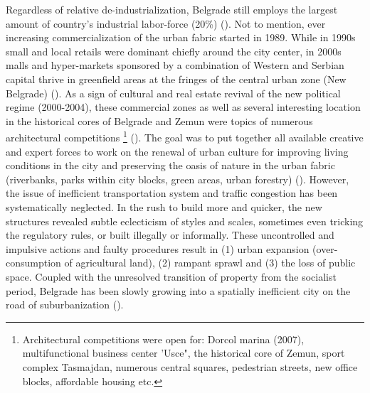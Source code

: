 \documentclass[11pt]{report}
\begin{document}
Regardless of relative de-industrialization, Belgrade  still  employs the largest amount of country’s industrial labor-force (20\%) (\href{}{\citealt{hirt_belgrade_2009}}).
Not to mention, ever increasing commercialization of the urban fabric started in 1989.
While in 1990s small and local retails were dominant chiefly around the city center, in 2000s  malls and hyper-markets sponsored by a combination of Western and Serbian capital thrive in greenfield areas at the fringes of the central urban zone (New Belgrade) (\cite{ibid.}).
As a sign of cultural and real estate revival of the new political regime (2000-2004), these commercial zones as well as several interesting location in the historical cores of Belgrade and Zemun were topics of numerous  architectural  competitions
\footnote{Architectural competitions were open for: Dorcol marina (2007), multifunctional business center 'Usce", the historical core of Zemun, sport complex Tasmajdan, numerous central squares, pedestrian streets, new office blocks, affordable housing etc.} %
(\href{}{\citealt{stupar_aleksandra_recreating_2004}}).
The goal was to put together all available creative and expert forces to work on the renewal of urban culture for improving living conditions in the city and preserving the oasis of nature in the urban fabric (riverbanks, parks within city blocks, green areas, urban forestry) (\href{}{\citealt{grozdanic_belgrade_2008}}).
However, the issue of inefficient transportation system and traffic congestion has been systematically neglected.
In the rush to build more and quicker, the new structures revealed subtle eclecticism of styles and scales, sometimes even tricking the regulatory rules, or built illegally or informally.
These uncontrolled and impulsive actions and faulty procedures result in (1) urban expansion (over-consumption of agricultural land), (2) rampant sprawl and (3) the loss of public space. Coupled with the unresolved transition of property from the socialist period, Belgrade has been slowly growing into a spatially inefficient city on the road of suburbanization (\href{}{\citealt{zekovic_spatial_2015}}).
\\
\end{document}
